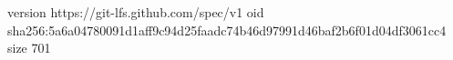 version https://git-lfs.github.com/spec/v1
oid sha256:5a6a04780091d1aff9c94d25faadc74b46d97991d46baf2b6f01d04df3061cc4
size 701
